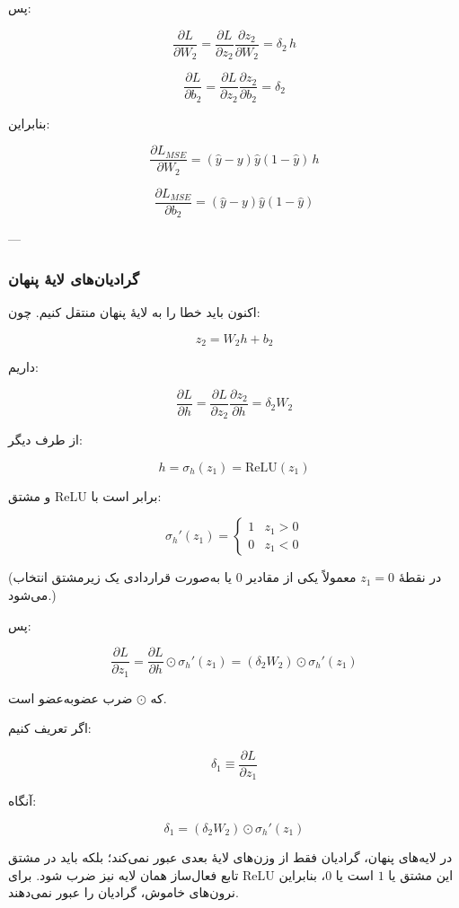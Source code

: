 \documentclass[12pt,a4paper]{article}
\begin{document}
پس:

\[
\frac{\partial L}{\partial W_2}
=
\frac{\partial L}{\partial z_2}
\frac{\partial z_2}{\partial W_2}
=
\delta_2\,h
\]

\[
\frac{\partial L}{\partial b_2}
=
\frac{\partial L}{\partial z_2}
\frac{\partial z_2}{\partial b_2}
=
\delta_2
\]

بنابراین:

\[
\boxed{
	\frac{\partial L_{MSE}}{\partial W_2}
	=
	(\hat{y}-y)\hat{y}(1-\hat{y})\,h
}
\]

\[
\boxed{
	\frac{\partial L_{MSE}}{\partial b_2}
	=
	(\hat{y}-y)\hat{y}(1-\hat{y})
}
\]

---

\subsubsection{گرادیان‌های لایهٔ پنهان}

اکنون باید خطا را به لایهٔ پنهان منتقل کنیم. چون:

\[
z_2=W_2h+b_2
\]

داریم:

\[
\frac{\partial L}{\partial h}
=
\frac{\partial L}{\partial z_2}
\frac{\partial z_2}{\partial h}
=
\delta_2 W_2
\]

از طرف دیگر:

\[
h=\sigma_h(z_1)=\mathrm{ReLU}(z_1)
\]

و مشتق ReLU برابر است با:

\[
\sigma_h'(z_1)=
\begin{cases}
	1 & z_1>0 \\
	0 & z_1<0
\end{cases}
\]

(در نقطهٔ \(z_1=0\) معمولاً یکی از مقادیر \(0\) یا به‌صورت قراردادی یک زیرمشتق انتخاب می‌شود.)

پس:

\[
\frac{\partial L}{\partial z_1}
=
\frac{\partial L}{\partial h}
\odot
\sigma_h'(z_1)
=
\left(\delta_2 W_2\right)\odot \sigma_h'(z_1)
\]

که \(\odot\) ضرب عضو‌به‌عضو است.

اگر تعریف کنیم:

\[
\delta_1 \equiv \frac{\partial L}{\partial z_1}
\]

آنگاه:

\[
\delta_1 = \left(\delta_2 W_2\right)\odot \sigma_h'(z_1)
\]

\begin{tcolorbox}[colback=green,colframe=mainblue,title=نکته مهم]
	در لایه‌های پنهان، گرادیان فقط از وزن‌های لایهٔ بعدی عبور نمی‌کند؛ بلکه باید در مشتق تابع فعال‌ساز همان لایه نیز ضرب شود.  
	برای ReLU این مشتق یا \(1\) است یا \(0\)، بنابراین نرون‌های خاموش، گرادیان را عبور نمی‌دهند.
\end{tcolorbox}
\end{document}
